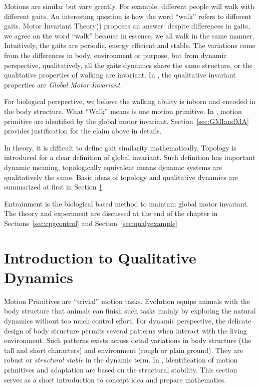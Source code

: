 Motions are similar but vary greatly.
For example, different people will walk with different gaits. 
An interesting question  is how the word ``walk'' refers to different gaits.
Motor Invariant Theory(\moit) proposes an answer:  despite differences in gaits, we agree on the word ``walk''  because in essence, we all walk in the same manner.
Intuitively, the gaits are periodic, energy efficient and stable.
The variations come from the differences in body, environment or purpose, but from dynamic perspective, qualitatively, all the gaits dynamics share the same structure, or the qualitative properties of walking are invariant.
In \moit, the qualitative invariant properties are \emph{Global Motor Invariant}.


For biological perspective, we believe the walking ability is inborn and encoded in the body structure.
What ``Walk'' means is one motion primitive.
In \moit, motion primitive are identified by the global motor invariant.
Section~\ref{sec:GMIandMA} provides justification for the claim above in details.


In theory, it is difficult to define gait similarity mathematically.
Topology is introduced for a clear definition of global invariant.
Such definition has important dynamic meaning, topologically equivalent means dynamic systems are qualitatively the same.
Basic ideas of topology and qualitative dynamics are summarized at first in Section \ref{sec:qualiDy}

Entrainment is the biological based method to maintain global motor invariant.
The theory and experiment are discussed at the end of the chapter in Sections~\ref{sec:cpgcontrol} and Section~\ref{sec:qualyexample}







\section{Introduction to Qualitative Dynamics}
\label{sec:qualiDy}
Motion Primitives are ``trivial'' motion tasks.
Evolution equips animals with the body structure that animals can finish such tasks mainly by exploring the natural dynamics without too much control effort.
For dynamic perspective, the delicate design of body structure permits several patterns when interact with the living environment.  
Such patterns exists across detail variations in body structure (the tall and short characters) and environment (rough or plain ground).
They are robust or \emph{structural stable} in the dynamic term.
In \moit, identification of motion primitives and adaptation are based on the structural stability.
This section serves as a short introduction to concept idea and prepare mathematics.


